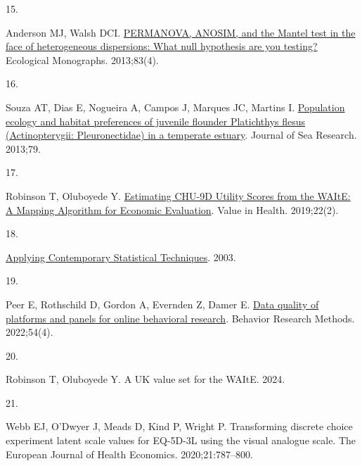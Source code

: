 \documentclass[
  letterpaper,
  DIV=11,
  numbers=noendperiod]{scrartcl}
\newlength{\cslhangindent}
\newlength{\csllabelwidth}
\newenvironment{CSLReferences}[2] %
 {\begin{list}{}{%
  \setlength{\itemindent}{0pt}
  \setlength{\leftmargin}{0pt}
  \setlength{\parsep}{0pt}
  \ifodd #1
   \setlength{\leftmargin}{\cslhangindent}
   \setlength{\itemindent}{-1\cslhangindent}
  \fi
  \setlength{\itemsep}{#2\baselineskip}}}
 {\end{list}}
\newcommand{\CSLLeftMargin}[1]{\parbox[t]{\csllabelwidth}{\strut#1\strut}}
\newcommand{\CSLRightInline}[1]{\parbox[t]{\linewidth - \csllabelwidth}{\strut#1\strut}}
\begin{document}
\begin{CSLReferences}{0}{1}
\CSLLeftMargin{15. }%
\CSLRightInline{Anderson MJ, Walsh DCI.
\href{https://doi.org/10.1890/12-2010.1}{{PERMANOVA, ANOSIM, and the
Mantel test in the face of heterogeneous dispersions: What null
hypothesis are you testing?}} Ecological Monographs. 2013;83(4). }

\CSLLeftMargin{16. }%
\CSLRightInline{Souza AT, Dias E, Nogueira A, Campos J, Marques JC,
Martins I.
\href{https://doi.org/10.1016/j.seares.2013.01.005}{{Population ecology
and habitat preferences of juvenile flounder Platichthys flesus
(Actinopterygii: Pleuronectidae) in a temperate estuary}}. Journal of
Sea Research. 2013;79. }

\CSLLeftMargin{17. }%
\CSLRightInline{Robinson T, Oluboyede Y.
\href{https://doi.org/10.1016/j.jval.2018.09.2839}{{Estimating CHU-9D
Utility Scores from the WAItE: A Mapping Algorithm for Economic
Evaluation}}. Value in Health. 2019;22(2). }

\CSLLeftMargin{18. }%
\CSLRightInline{\href{https://doi.org/10.1016/b978-0-12-751541-0.x5021-4}{{Applying
Contemporary Statistical Techniques}}. 2003. }

\CSLLeftMargin{19. }%
\CSLRightInline{Peer E, Rothschild D, Gordon A, Evernden Z, Damer E.
\href{https://doi.org/10.3758/s13428-021-01694-3}{{Data quality of
platforms and panels for online behavioral research}}. Behavior Research
Methods. 2022;54(4). }

\CSLLeftMargin{20. }%
\CSLRightInline{Robinson T, Oluboyede Y. A UK value set for the WAItE.
2024. }

\CSLLeftMargin{21. }%
\CSLRightInline{Webb EJ, O'Dwyer J, Meads D, Kind P, Wright P.
Transforming discrete choice experiment latent scale values for EQ-5D-3L
using the visual analogue scale. The European Journal of Health
Economics. 2020;21:787--800. }

\end{CSLReferences}
\end{document}
